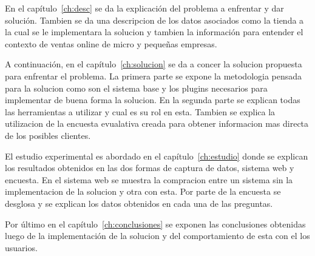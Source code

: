 En el capítulo~\ref{ch:desc} se da la explicación del problema a enfrentar
y dar solución.
Tambien se da una descripcion de los datos asociados como la tienda a la cual se
le implementara la solucion y tambien la información para entender el contexto
de ventas online de micro y pequeñas empresas.

A continuación, en el capítulo~\ref{ch:solucion} se da a concer la solucion
propuesta para enfrentar el problema.
La primera parte se expone la metodologia pensada para la solucion como son el
sistema base y los plugins necesarios para implementar de buena forma la solucion.
En la segunda parte se explican todas las herramientas a utilizar y cual es su
rol en esta.
Tambien se explica la utilizacion de la encuesta evualativa creada para obtener
informacion mas directa de los posibles clientes.

El estudio experimental es abordado en el capítulo~\ref{ch:estudio} donde
se explican los resultados obtenidos en las dos formas de captura de datos,
sistema web y encuesta.
En el sistema web se muestra la compracion entre un sistema sin la implementacion
de la solucion y otra con esta.
Por parte de la encuesta se desglosa y se explican los datos obtenidos en cada
una de las preguntas.

Por último en el capítulo~\ref{ch:conclusiones} se exponen las conclusiones
obtenidas luego de la implementación de la solucion y del comportamiento de esta
con el los usuarios.
